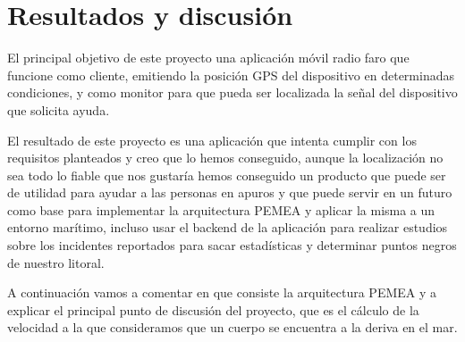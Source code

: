 \chapter{Resultados y discusión}
\label{resultados}


El principal objetivo de este proyecto una aplicación móvil radio faro que funcione como cliente, emitiendo la posición GPS del dispositivo en determinadas condiciones, y como monitor para que pueda ser localizada la señal del dispositivo que solicita ayuda.

El resultado de este proyecto es una aplicación que intenta cumplir con los requisitos planteados y creo que lo hemos conseguido, aunque la localización no sea todo lo fiable que nos gustaría hemos conseguido un producto que puede ser de utilidad para ayudar a las personas en apuros y que puede servir en un futuro como base para implementar la arquitectura PEMEA \cite{PEMEA} y aplicar la misma a un entorno marítimo, incluso usar el backend de la aplicación para realizar estudios sobre los incidentes reportados para sacar estadísticas y determinar puntos negros de nuestro litoral.

A continuación vamos a comentar en que consiste la arquitectura PEMEA y a explicar el principal punto de discusión del proyecto, que es el cálculo de la velocidad a la que consideramos que un cuerpo se encuentra a la deriva en el mar.

